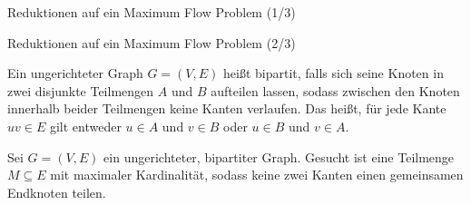 \documentclass[aspectratio=169]{beamer}
\begin{document}
\begin{frame}{Reduktionen auf ein Maximum Flow Problem  (1/3)}
\begin{problem}[Knotenkapazitäten]
\begin{figure}
{
  }
  
  \end{figure}
\end{problem}
  
\end{frame}


\begin{frame}{Reduktionen auf ein Maximum Flow Problem  (2/3)}

  \begin{definition}
    Ein ungerichteter Graph $G = (V, E)$ heißt bipartit, 
    falls sich seine Knoten in zwei disjunkte Teilmengen $A$ und $B$ aufteilen lassen, 
    sodass zwischen den Knoten innerhalb beider Teilmengen keine Kanten verlaufen. 
    Das heißt, für jede Kante $uv \in E$ gilt entweder $u \in A$ und $v \in B$ oder $u \in B$ und $v \in A$.
  \end{definition}

  \begin{problem}
    Sei $G = (V,E)$ ein ungerichteter, bipartiter Graph.
    Gesucht ist eine Teilmenge $M \subseteq E$ mit maximaler Kardinalität,
    sodass keine zwei Kanten einen gemeinsamen Endknoten teilen.

  \end{problem} 
\end{frame}
\end{document}
